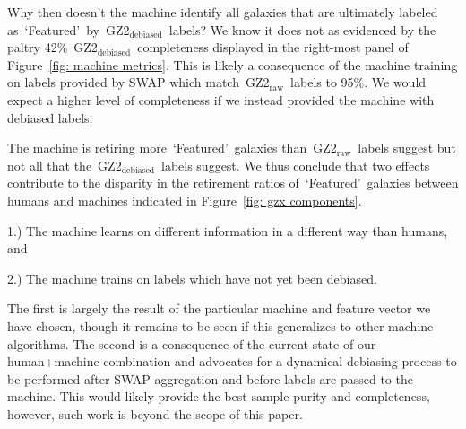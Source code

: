 \documentclass[twocolumn]{aastex6}
\newcommand{\feat}{`Featured'}
\newcommand{\notfeat}{`Not'}
\newcommand{\raw}{GZ2$_{\text{raw}}$}
\newcommand{\deb}{GZ2$_{\text{debiased}}$}
\begin{document}
Why then doesn't the machine identify all galaxies that are ultimately
labeled as~\feat~by~\deb~labels? We know it does not as evidenced by the paltry
42\%~\deb~completeness displayed in the right-most panel of Figure~\ref{fig: machine metrics}.
This is likely a consequence of the machine training on labels provided by SWAP 
which match~\raw~labels to 95\%. We would expect a higher level of completeness
 if we instead provided the machine with debiased labels. 

The machine is retiring more~\feat~galaxies than~\raw~labels suggest but not all that 
the~\deb~labels suggest. 
We thus conclude that two effects contribute to the disparity in the retirement 
ratios of~\feat~galaxies between humans and machines indicated in Figure~\ref{fig: gzx components}. 

1.) The machine learns on different information in a different way than humans, and

2.) The machine trains on labels which have not yet been debiased. 

The first is largely the result 
of the particular machine and feature vector we have chosen, though it remains to be
seen if this generalizes to other machine algorithms. The second is a consequence
of the current state of our human+machine combination and advocates for a dynamical
debiasing process to be performed after SWAP aggregation and before labels are passed
to the machine. This would likely provide the best sample purity and completeness, 
however, such work is beyond the scope of this paper.  


\end{document}
